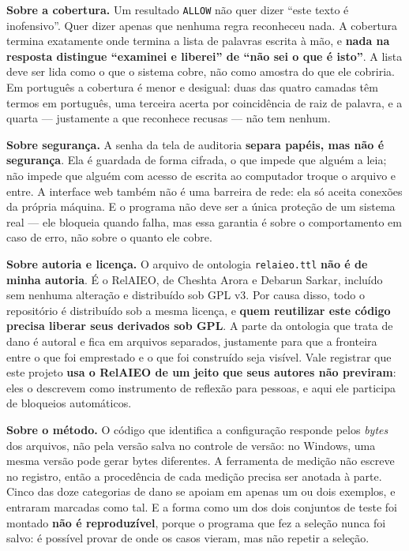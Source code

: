 \documentclass[10pt]{article}
\begin{document}
\textbf{Sobre a cobertura.} Um resultado \texttt{ALLOW} não quer dizer ``este texto é inofensivo''. Quer dizer apenas que nenhuma regra reconheceu nada. A cobertura termina exatamente onde termina a lista de palavras escrita à mão, e \textbf{nada na resposta distingue ``examinei e liberei'' de ``não sei o que é isto''}. A lista deve ser lida como o que o sistema cobre, não como amostra do que ele cobriria. Em português a cobertura é menor e desigual: duas das quatro camadas têm termos em português, uma terceira acerta por coincidência de raiz de palavra, e a quarta --- justamente a que reconhece recusas --- não tem nenhum.

\textbf{Sobre segurança.} A senha da tela de auditoria \textbf{separa papéis, mas não é segurança}. Ela é guardada de forma cifrada, o que impede que alguém a leia; não impede que alguém com acesso de escrita ao computador troque o arquivo e entre. A interface web também não é uma barreira de rede: ela só aceita conexões da própria máquina. E o programa não deve ser a única proteção de um sistema real --- ele bloqueia quando falha, mas essa garantia é sobre o comportamento em caso de erro, não sobre o quanto ele cobre.

\textbf{Sobre autoria e licença.} O arquivo de ontologia \texttt{relaieo.ttl} \textbf{não é de minha autoria}. É o RelAIEO, de Cheshta Arora e Debarun Sarkar, incluído sem nenhuma alteração e distribuído sob GPL v3. Por causa disso, todo o repositório é distribuído sob a mesma licença, e \textbf{quem reutilizar este código precisa liberar seus derivados sob GPL}. A parte da ontologia que trata de dano é autoral e fica em arquivos separados, justamente para que a fronteira entre o que foi emprestado e o que foi construído seja visível. Vale registrar que este projeto \textbf{usa o RelAIEO de um jeito que seus autores não previram}: eles o descrevem como instrumento de reflexão para pessoas, e aqui ele participa de bloqueios automáticos.

\textbf{Sobre o método.} O código que identifica a configuração responde pelos \emph{bytes} dos arquivos, não pela versão salva no controle de versão: no Windows, uma mesma versão pode gerar bytes diferentes. A ferramenta de medição não escreve no registro, então a procedência de cada medição precisa ser anotada à parte. Cinco das doze categorias de dano se apoiam em apenas um ou dois exemplos, e entraram marcadas como tal. E a forma como um dos dois conjuntos de teste foi montado \textbf{não é reproduzível}, porque o programa que fez a seleção nunca foi salvo: é possível provar de onde os casos vieram, mas não repetir a seleção.
\end{document}
